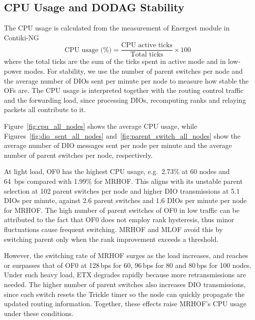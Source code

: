 \subsection{CPU Usage and DODAG Stability}
The CPU usage is calculated from the measurement of Energest module
in Contiki-NG
\begin{equation}
    \text{CPU usage (\%)} = \frac{\text{CPU active ticks}}{\text{Total
    ticks}} \times 100
\end{equation}
where the total ticks are the sum of the ticks spent in active mode
and in low-power modes.
For stability, we use the number of parent switches per node and the
average number of DIOs sent per minute per node to measure how stable
the OFs are.
The CPU usage is interpreted together with the routing control traffic
and the forwarding load, since processing DIOs, recomputing ranks and
relaying packets all contribute to it.

Figure~\ref{fig:cpu_all_nodes} shows the average CPU usage, while
Figures~\ref{fig:dio_sent_all_nodes}
and~\ref{fig:parent_switch_all_nodes} show the average number of DIO
messages sent per node per minute and
the average number of parent switches per node, respectively.

At light load, OF0 has the highest CPU usage, e.g.\ 2.73\% at
60 nodes and 64~bps compared with 1.99\% for MRHOF. This aligns
with its unstable parent selection at 102 parent switches
per node and higher DIO transmissions at 5.1 DIOs per minute, against
2.6 parent switches and 1.6 DIOs per minute per node for MRHOF.
The high number of parent switches of OF0 in low traffic can be
attributed to the
fact that OF0 does not employ rank hysteresis, thus minor
fluctuations cause frequent switching. MRHOF and MLOF avoid this by
switching parent only
when the rank improvement exceeds a threshold.

However, the switching rate of MRHOF surges as the load increases, and
reaches or surpasses that of OF0 at 128\,bps for 60, 96\,bps for 80
and 80\,bps for 100 nodes.
Under such heavy load, ETX degrades rapidly because more
retransmissions are needed. The higher number of parent switches
also increases DIO transmissions, since each switch resets the
Trickle timer so the node can quickly propagate the updated
routing information. Together, these effects raise MRHOF's CPU
usage under these conditions.

